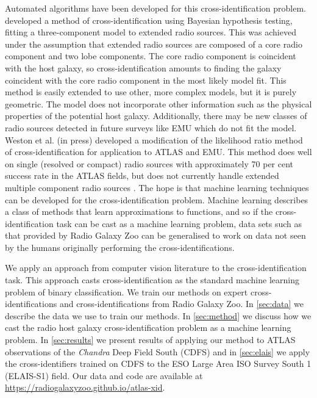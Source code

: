 \documentclass[fleqn,usenatbib,usedcolumn]{mnras}
\begin{document}
  Automated algorithms have been developed for this cross-identification
  problem. \citet{fan15} developed a method of cross-identification using
  Bayesian hypothesis testing, fitting a three-component model to extended
  radio sources. This was achieved under the assumption that extended radio
  sources are composed of a core radio component and two lobe components. The
  core radio component is coincident with the host galaxy, so
  cross-identification amounts to finding the galaxy coincident with the core
  radio component in the most likely model fit. This method is easily extended
  to use other, more complex models, but it is purely geometric. The model
  does not incorporate other information such as the physical properties of
  the potential host galaxy. Additionally, there may be new classes of radio
  sources detected in future surveys like EMU which do not fit the model.
  Weston et al. (in press) developed a modification of the likelihood ratio method of
  cross-identification \citep{richter75likelihood} for application to ATLAS
  and EMU. This method does well on single (resolved or compact) radio sources
  with approximately 70 per cent success rate in the ATLAS fields, but does
  not currently handle extended multiple component radio sources
  \citep{norris17unexpected}. The hope is that machine learning techniques can
  be developed for the cross-identification problem. Machine learning
  describes a class of methods that learn approximations to functions, and so
  if the cross-identification task can be cast as a machine learning problem,
  data sets such as that provided by Radio Galaxy Zoo can be generalised to
  work on data not seen by the humans originally performing the cross-identifications.

  We apply an approach from computer vision literature to the
  cross-identification task. This approach casts cross-identification as the
  standard machine learning problem of binary classification. We train our
  methods on expert cross-identifications and cross-identifications from Radio
  Galaxy Zoo. In \autoref{sec:data} we describe the data we use to train our
  methods. In \autoref{sec:method} we discuss how we cast the radio host
  galaxy cross-identification problem as a machine learning problem. In
  \autoref{sec:results} we present results of applying our method to ATLAS
  observations of the \emph{Chandra} Deep Field South (CDFS) and in
  \autoref{sec:elais} we apply the cross-identifiers trained on CDFS to the
  ESO Large Area ISO Survey South 1 (ELAIS-S1) field. Our data and code are
  available at \url{https://radiogalaxyzoo.github.io/atlas-xid}.
\end{document}
